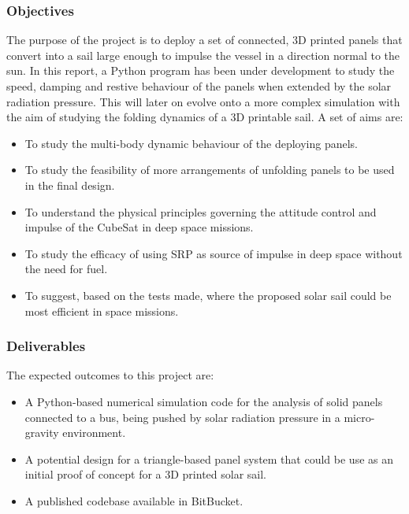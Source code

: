 \subsubsection{Objectives}

The purpose of the project is to deploy a set of connected, 3D printed panels that convert into a sail large enough to impulse the vessel in a direction normal to the 
sun. In this report, a Python program has been under development to study the speed, damping and restive behaviour of the panels when extended by the solar radiation pressure. This will later on evolve onto a more complex simulation with the aim of studying the folding dynamics of a 3D printable sail. A set of aims are:

\begin{itemize}
    \item To study the multi-body dynamic behaviour of the deploying panels.
    \item To study the feasibility of more arrangements of unfolding panels to be used in the final design.
    \item To understand the physical principles governing the attitude control and impulse of the CubeSat in deep space missions.
    \item To study the efficacy of using SRP as source of impulse in deep space without the need for fuel.
    \item To suggest, based on the tests made, where the proposed solar sail could be most efficient in space missions.
\end{itemize}

\subsubsection{Deliverables}

The expected outcomes to this project are:

\begin{itemize}
    \item A Python-based numerical simulation code for the analysis of solid panels connected to a bus, being pushed by solar radiation pressure in a micro-gravity environment.
    \item A potential design for a triangle-based panel system that could be use as an initial proof of concept for a 3D printed solar sail.
    \item A published codebase available in BitBucket.
\end{itemize}


